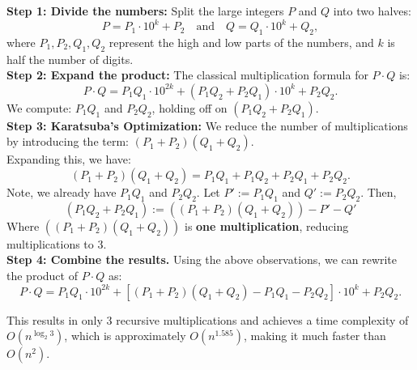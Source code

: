 \begin{Proof}

    \textbf{Step 1: Divide the numbers:} 
    Split the large integers \( P \) and \( Q \) into two halves:
    \[
    P = P_1 \cdot 10^k + P_2 \quad \text{and} \quad Q = Q_1 \cdot 10^k + Q_2,
    \]
    where \( P_1, P_2, Q_1, Q_2 \) represent the high and low parts of the numbers, and \( k \) is half the number of digits.\\

    \noindent
    \textbf{Step 2: Expand the product:} 
    The classical multiplication formula for \( P \cdot Q \) is:
    \[
    P \cdot Q = P_1 Q_1 \cdot 10^{2k} + (P_1 Q_2 + P_2 Q_1) \cdot 10^k + P_2 Q_2.
    \]
    We compute: \( P_1 Q_1 \) and \( P_2 Q_2 \), holding off on $(P_1 Q_2 + P_2 Q_1)$.\\

    \noindent
    \textbf{Step 3: Karatsuba’s Optimization:} 
    We reduce the number of multiplications by introducing the term: $ (P_1 + P_2)(Q_1 + Q_2)$.\\
    Expanding this, we have:
    \[
    (P_1 + P_2)(Q_1 + Q_2) = P_1 Q_1 + P_1 Q_2 + P_2 Q_1 + P_2 Q_2.
    \]
    Note, we already have \( P_1 Q_1 \) and \( P_2 Q_2 \). Let $P':= P_1 Q_1$ and $Q':= P_2 Q_2$. Then,
    \[
        (P_1 Q_2 + P_2 Q_1):= ((P_1 + P_2)(Q_1 + Q_2))-P'-Q'
    \]
    Where $((P_1 + P_2)(Q_1 + Q_2))$ is \textbf{one multiplication}, reducing multiplications to 3.\\
    

    \noindent
    \textbf{Step 4: Combine the results.} 
    Using the above observations, we can rewrite the product of \( P \cdot Q \) as:
    \[
    P \cdot Q = P_1 Q_1 \cdot 10^{2k} + \left[ (P_1 + P_2)(Q_1 + Q_2) - P_1 Q_1 - P_2 Q_2 \right] \cdot 10^k + P_2 Q_2.
    \]

    \noindent
    This results in only 3 recursive multiplications and achieves a time complexity of \( O(n^{\log_2 3}) \), which is approximately \( O(n^{1.585}) \), making it much faster than \( O(n^2) \).

\end{Proof}

\newpage 



